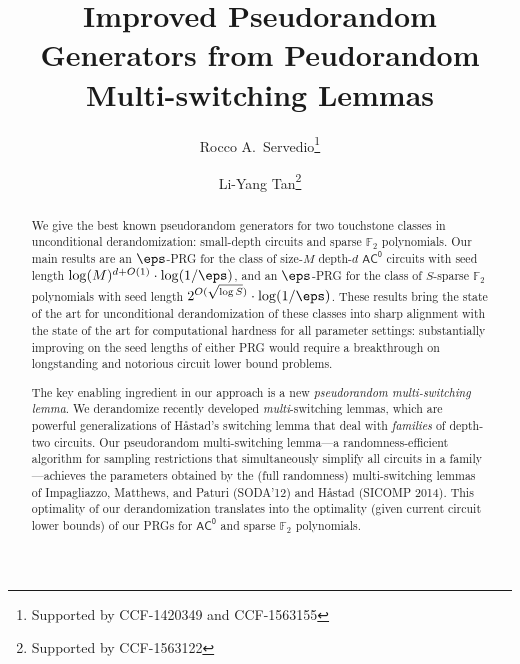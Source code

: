\documentclass{toc}
\theoremstyle{plain}
\newcommand{\acz}{\mathsf{AC^0}}
\renewcommand{\F}{\mathds{F}}
\begin{document}
\begin{frontmatter} %
  
%
\title{Improved Pseudorandom Generators from Peudorandom Multi-switching
    Lemmas
}

%
%

%
%
%

%
%
%
%
%
%
%
%
%
%
%
%


%
%
%
%

%

\author[servedio]{Rocco A.~Servedio\thanks{Supported by CCF-1420349 and CCF-1563155}}
\author[tan]{Li-Yang Tan\thanks{Supported by CCF-1563122}}

%
%
%
%

%
%
%
%
%
%
\begin{abstract}
We give the best known pseudorandom generators for two touchstone classes in unconditional derandomization: small-depth circuits and sparse $\F_2$ polynomials.  Our main results are an $\eps$-PRG for the class of size-$M$ depth-$d$ $\acz$ circuits with seed length $\log(M)^{d+O(1)}\cdot \log(1/\eps)$, and an $\eps$-PRG for the class of $S$-sparse $\F_2$ polynomials with seed length $2^{O(\sqrt{\log S})}\cdot \log(1/\eps)$. 
These results bring the state of the art for unconditional derandomization of these classes into sharp alignment with the state of the art for computational hardness for all parameter settings: substantially improving on the seed lengths of either PRG would require
%
a breakthrough  %
on longstanding and notorious circuit lower bound
%
%
problems.   %

The key enabling ingredient in our approach is a new \emph{pseudorandom multi-switching lemma}.  We derandomize 
%
recently developed %
\emph{multi}-switching lemmas, which are powerful generalizations of H{\aa}stad's switching lemma that deal with \emph{families} of depth-two circuits. Our pseudorandom multi-switching lemma---a randomness-efficient algorithm for sampling restrictions that simultaneously simplify all circuits in a family---achieves the parameters obtained by the (full randomness) multi-switching lemmas of Impagliazzo, Matthews, and Paturi %
(SODA'12)   %
and H{\aa}stad  %
(SICOMP 2014).   %
This optimality of our derandomization translates into the optimality (given current circuit lower bounds) of our PRGs for $\acz$ and sparse $\F_2$ polynomials. 
\end{abstract}

%

\end{frontmatter}
\end{document}

